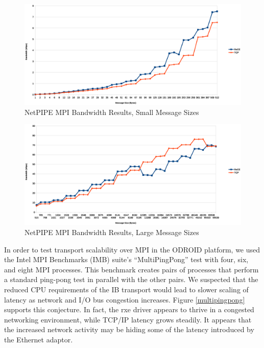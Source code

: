\documentclass[a4paper]{article}
\begin{document}
\begin{figure}[H]
\includegraphics[width=\textwidth]{netpipe_bw_small}
\caption{NetPIPE MPI Bandwidth Results, Small Message Sizes}
\label{npmpi-lbw}
\end{figure}



\begin{figure}[H]
\includegraphics[width=\textwidth]{netpipe_bw_large}
\caption{NetPIPE MPI Bandwidth Results, Large Message Sizes}
\label{npmpi-hbw}
\end{figure}

In order to test transport scalability over MPI in the ODROID platform, we used
the Intel MPI Benchmarks (IMB) suite's ``MultiPingPong'' test with four, six,
and eight MPI processes. This benchmark creates pairs of processes that perform
a standard ping-pong test in parallel with the other pairs. We suspected that
the reduced CPU requirements of the IB transport would lead to slower scaling of
latency as network and I/O bus congestion increases. Figure \ref{multipingpong}
supports this conjecture. In fact, the rxe driver appears to thrive in a
congested networking environment, while TCP/IP latency grows steadily. It
appears that the increased network activity may be hiding some of the latency
introduced by the Ethernet adaptor. %
\end{document}
